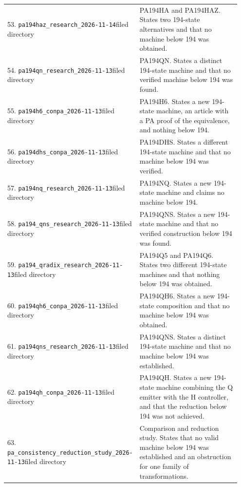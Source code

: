 \begin{longtable}{@{}p{0.43\linewidth}p{0.52\linewidth}@{}}
53. \nolinkurl{pa194haz_research_2026-11-14}\newline filed directory&PA194HA and PA194HAZ. States two 194-state alternatives and that no machine below 194 was obtained.\\[5pt]
54. \nolinkurl{pa194qn_research_2026-11-13}\newline filed directory&PA194QN. States a distinct 194-state machine and that no verified machine below 194 was found.\\[5pt]
55. \nolinkurl{pa194h6_conpa_2026-11-13}\newline filed directory&PA194H6. States a new 194-state machine, an article with a PA proof of the equivalence, and nothing below 194.\\[5pt]
56. \nolinkurl{pa194dhs_conpa_2026-11-13}\newline filed directory&PA194DHS. States a different 194-state machine and that no machine below 194 was verified.\\[5pt]
57. \nolinkurl{pa194nq_research_2026-11-13}\newline filed directory&PA194NQ. States a new 194-state machine and claims no machine below 194.\\[5pt]
58. \nolinkurl{pa194_qns_research_2026-11-13}\newline filed directory&PA194QNS. States a new 194-state machine and that no verified construction below 194 was found.\\[5pt]
59. \nolinkurl{pa194_qradix_research_2026-11-13}\newline filed directory&PA194Q5 and PA194Q6. States two different 194-state machines and that nothing below 194 was obtained.\\[5pt]
60. \nolinkurl{pa194qh6_conpa_2026-11-13}\newline filed directory&PA194QH6. States a new 194-state composition and that no machine below 194 was obtained.\\[5pt]
61. \nolinkurl{pa194qns_research_2026-11-13}\newline filed directory&PA194QNS. States a distinct 194-state machine and that no machine below 194 was established.\\[5pt]
62. \nolinkurl{pa194qh_conpa_2026-11-13}\newline filed directory&PA194QH. States a new 194-state machine combining the Q emitter with the H controller, and that the reduction below 194 was not achieved.\\[5pt]
63. \nolinkurl{pa_consistency_reduction_study_2026-11-13}\newline filed directory&Comparison and reduction study. States that no valid machine below 194 was established and an obstruction for one family of transformations.\\[5pt]

\end{longtable}
